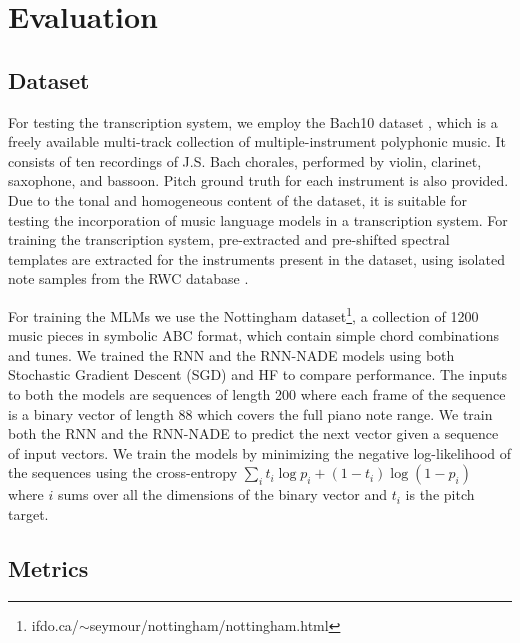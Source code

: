 \section{Evaluation} \label{sec:evaluation}

\subsection{Dataset}

For testing the transcription system, we employ the Bach10 dataset \cite{Duan2010}, which is a freely available multi-track collection of multiple-instrument polyphonic music. It consists of ten recordings of J.S. Bach chorales, performed by violin, clarinet, saxophone, and bassoon. Pitch ground truth for each instrument is also provided. Due to the tonal and homogeneous content of the dataset, it is suitable for testing the incorporation of music language models in a transcription system. For training the transcription system, pre-extracted and pre-shifted spectral templates are extracted for the instruments present in the dataset, using isolated note samples from the RWC database \cite{Goto2003}. 

For training the MLMs we use the Nottingham dataset\footnote{ifdo.ca/$\sim$seymour/nottingham/nottingham.html}, a collection of 1200 music pieces in symbolic ABC format, which contain simple chord combinations and tunes. We trained the RNN and the RNN-NADE models using both Stochastic Gradient Descent (SGD) and HF to compare performance. The inputs to both the models are sequences of length 200 where each frame of the sequence is a binary vector of length 88 which covers the full piano note range. We train both the RNN and the RNN-NADE to predict the next vector given a sequence of input vectors. We train the models by minimizing the negative log-likelihood of the sequences using the cross-entropy $ \sum_{i}t_{i}\log p_{i} + (1 - t_{i})\log(1-p_{i})$ where $i$ sums over all the dimensions of the binary vector and $t_i$ is the pitch target.


\subsection{Metrics}


